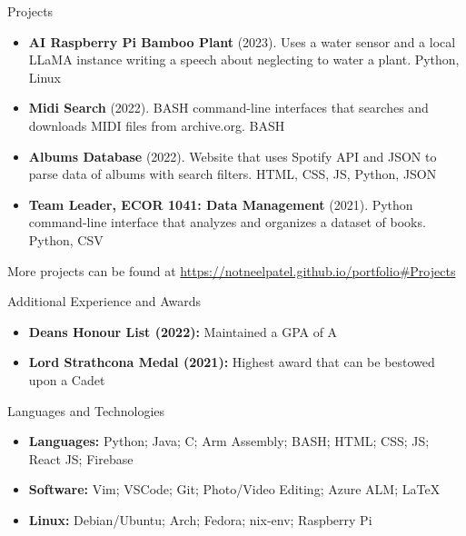 \documentclass[]{mcdowellcv}
\begin{document}
	\begin{cvsection}{Projects}
		\begin{cvsubsection}{}{}{}
			\begin{itemize}
				\item \textbf{AI Raspberry Pi Bamboo Plant} (2023). Uses a water sensor and a local LLaMA instance writing a speech about neglecting to water a plant. Python, Linux
				\item \textbf{Midi Search} (2022). BASH command-line interfaces that searches and downloads MIDI files from archive.org. BASH
				\item \textbf{Albums Database} (2022). Website that uses Spotify API and JSON to parse data of albums with search filters. HTML, CSS, JS, Python, JSON
				\item \textbf{Team Leader, ECOR 1041: Data Management} (2021). Python command-line interface that analyzes and organizes a dataset of books. Python, CSV
			\end{itemize}
			
				More projects can be found at \url{https://notneelpatel.github.io/portfolio#Projects}
		\end{cvsubsection}
	\end{cvsection}
	
	\begin{cvsection}{Additional Experience and Awards}
		\begin{cvsubsection}{}{}{}	
			\begin{itemize}
				\item \textbf {Deans Honour List (2022):} Maintained a GPA of A
				\item \textbf{Lord Strathcona Medal (2021):} Highest award that can be bestowed upon a Cadet
			\end{itemize}
		
		\end{cvsubsection}
	\end{cvsection}
	
	\begin{cvsection}{Languages and Technologies}
		\begin{cvsubsection}{}{}{}	
			\begin{itemize}
					\item \textbf{Languages:} Python; Java; C; Arm Assembly; BASH; HTML; CSS; JS; React JS; Firebase
					\item \textbf{Software:} Vim; VSCode; Git; Photo/Video Editing; Azure ALM; \LaTeX
					\item \textbf{Linux:} Debian/Ubuntu; Arch; Fedora; nix-env; Raspberry Pi 
			\end{itemize}
		\end{cvsubsection}
	\end{cvsection}
	
\end{document}
